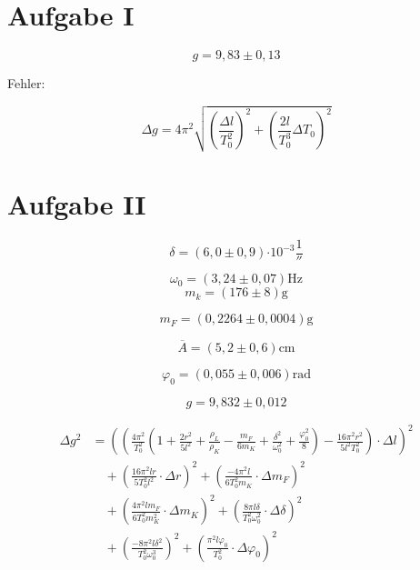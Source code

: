 \section{Aufgabe I}

\[g =9,83 \pm 0,13\]

Fehler:

\begin{equation}
    \Delta g = 4\pi^2 \sqrt{\left(\frac{\Delta l}{T_0^2}\right)^2 + \left(\frac{2l}{T_0^3}\Delta T_0\right)^2}
\end{equation}

\section{Aufgabe II}

\[ \delta = (6,0 \pm 0,9) \si{\cdot 10^{-3}\frac{1}{\second}}\]

\[ \omega_0 = (3,24 \pm 0,07) \si{\Hz} \]
\[m_k = (176 \pm 8) \si{\gram}\]

\[m_F = (0,2264 \pm 0,0004) \si{\gram}\]

\[ \overline{A} = (5,2 \pm 0,6) \si{\cm}\]

\[\varphi_0 =( 0,055 \pm 0,006 )\si{\text{rad}}\]

\[g = 9,832 \pm 0,012\]

\begin{align}
\Delta g^{2} 
&= \left( 
    \left( 
        \frac{4\pi^{2}}{T_{0}^{2}}
        \left( 
            1 + \frac{2r^{2}}{5l^{2}} + \frac{\rho_{L}}{\rho_{K}} 
            - \frac{m_{F}}{6m_{K}} + \frac{\delta^{2}}{\omega_{0}^{2}} 
            + \frac{\varphi_{0}^{2}}{8} 
        \right) 
        - \frac{16\pi^{2}r^{2}}{5l^{2}T_{0}^{2}} 
    \right) \cdot \Delta l 
\right)^{2} \\[1ex]
&\quad + \left( 
    \frac{16\pi^{2}lr}{5T_{0}^{2}l^{2}} \cdot \Delta r 
\right)^{2} 
+ \left( 
    \frac{-4\pi^{2}l}{6T_{0}^{2}m_{K}} \cdot \Delta m_{F} 
\right)^{2} \\[1ex]
&\quad + \left( 
    \frac{4\pi^{2}lm_{F}}{6T_{0}^{2}m_{K}^{2}} \cdot \Delta m_{K} 
\right)^{2} 
+ \left( 
    \frac{8\pi l \delta}{T_{0}^{2}\omega_{0}^{2}} \cdot \Delta \delta 
\right)^{2} \\[1ex]
&\quad + \left( 
    \frac{-8\pi^{2}l\delta^{2}}{T_{0}^{2}\omega_{0}^{3}} 
\right)^{2} 
+ \left( 
    \frac{\pi^{2}l\varphi_{0}}{T_{0}^{2}} \cdot \Delta \varphi_{0} 
\right)^{2}
\end{align}
